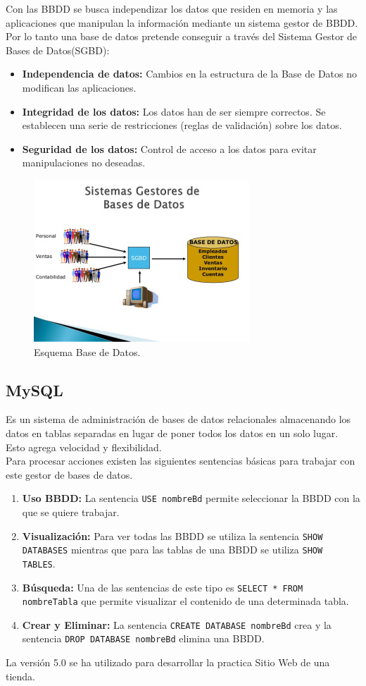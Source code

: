 Con las BBDD se busca independizar los datos que residen en memoria y las aplicaciones que manipulan la información mediante un sistema gestor de BBDD. Por lo tanto una base de datos pretende conseguir a través del Sistema Gestor de Bases de Datos(SGBD):
\begin{itemize}
\item \textbf{Independencia de datos:} Cambios en la estructura de la Base de Datos no modifican las aplicaciones.
\item \textbf{Integridad de los datos:} Los datos han de ser siempre correctos. Se establecen una serie de restricciones (reglas de validación) sobre los datos.
\item \textbf{Seguridad de los datos:} Control de acceso a los datos para evitar manipulaciones no deseadas. 
\end{itemize}
\begin{figure}[!h]
\begin{center}
   \includegraphics[width=0.5\linewidth]{Figures/BBDD_Esquema}
  \decoRule
  \caption[Esquema Base de Datos.]{Esquema Base de Datos.}
\label{fig:BBDD_Esquema}
\end{center}
\end{figure}
\subsection{MySQL}
Es un sistema de administración de bases de datos relacionales almacenando los datos en tablas separadas en lugar de poner todos los datos en un solo lugar. Esto agrega velocidad y flexibilidad.
\\Para procesar acciones existen las siguientes sentencias básicas para trabajar con este gestor de bases de datos.
\begin{enumerate}
\item \textbf{Uso BBDD:} La sentencia \texttt{USE nombreBd} permite seleccionar la BBDD con la que se quiere trabajar.
\item \textbf{Visualización:} Para ver todas las BBDD se utiliza la sentencia \texttt{SHOW DATABASES} mientras que para las tablas de una BBDD se utiliza \texttt{SHOW TABLES}.
\item \textbf{Búsqueda:} Una de las sentencias de este tipo es \texttt{SELECT * FROM nombreTabla} que permite visualizar el contenido de una determinada tabla.
\item \textbf{Crear y Eliminar:} La sentencia \texttt{CREATE DATABASE nombreBd} crea y la sentencia \texttt{DROP DATABASE nombreBd} elimina una BBDD.
\end{enumerate}
La versión 5.0 se ha utilizado para desarrollar la practica Sitio Web de una tienda.
